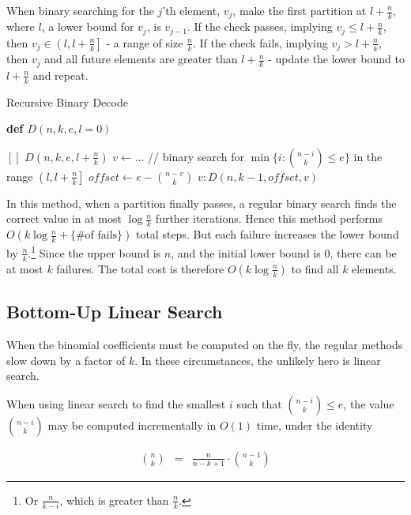 \documentclass[preprint]{sigplanconf}
\begin{document}
	When binary searching for the $j$'th element, $v_j$, make the first partition at $l + \frac{n}{k}$, where $l$, a lower bound for $v_j$, is $v_{j-1}$.
	If the check passes, implying $v_j \le l + \frac{n}{k}$, then $v_j \in \left( l, l + \frac{n}{k} \right]$ - a range of size $\frac{n}{k}$.
	If the check fails, implying $v_j > l + \frac{n}{k}$, then $v_j$ and all future elements are greater than $l + \frac{n}{k}$  - update the lower bound to $l + \frac{n}{k}$ and repeat.
	
	\begin{algorithm}[!ht]
	\caption{Recursive Binary Decode}
	\label{alg:Drb}
	
	\textbf{def $D(n,k,e,l=0)$}
	\begin{algorithmic}[1]
		\RETURN $[]$
		\RETURN $D(n,k,e,l+\frac{n}{k})$
	\ELSE
		\STATE $v \gets \ldots$ // binary search for $\min\{i:\binom{n-i}{k}\le e\}$ in the range $\left( l, l+\frac{n}{k} \right]$
		\STATE $offset \gets e - \binom{n-v}{k}$
		\RETURN $v : D(n,k-1,offset,v)$
	\ENDIF
	\end{algorithmic}
		
	\end{algorithm}

	In this method, when a partition finally passes, a regular binary search finds the correct value in at most $\log\frac{n}{k}$ further iterations.
	Hence this method performs $O(k\log\frac{n}{k} + \{ \text{\# of fails} \})$ total steps.
	But each failure increases the lower bound by $\frac{n}{k}$.\footnote{
		Or $\frac{n}{k-i}$, which is greater than $\frac{n}{k}$.}
	Since the upper bound is $n$, and the initial lower bound is $0$, there can be at most $k$ failures.
	The total cost is therefore $O(k\log\frac{n}{k})$ to find all $k$ elements.
	
	
	\subsection{Bottom-Up Linear Search}
	
	When the binomial coefficients must be computed on the fly, the regular methods slow down by a factor of $k$.
	In these circumstances, the unlikely hero is linear search.
	
	When using linear search to find the smallest $i$ such that $\binom{n-i}{k} \le e$, the value $\binom{n-i}{k}$ may be computed incrementally in $O(1)$ time, under the identity
	
	\begin{eqnarray*}
		\binom{n}{k} & = & \frac{n}{n-k+1}\cdot\binom{n-1}{k}
	\end{eqnarray*}
	
\end{document}
